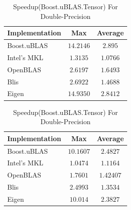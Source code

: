 \begin{table}[ht]
    \centering
    \caption{Speedup(Boost.uBLAS.Tensor) For Single-Precision}
    \begin{tabular}{|l|c|c|}
        \hline
        \textbf{Implementation} & \textbf{Max} & \textbf{Average}\\
        \hline
        Boost.uBLAS         & $14.2146$ & $2.895$ \\
        \hline
        Intel's MKL         & $1.3135$ & $1.0766$ \\
        \hline
        OpenBLAS            & $2.6197$ & $1.6493$ \\
        \hline
        Blis                & $2.6922$ & $1.4688$ \\
        \hline
        Eigen               & $14.9350$ & $2.8412$ \\
        \hline
    \end{tabular}

    \vspace*{1 cm}

    \centering
    \caption{Speedup(Boost.uBLAS.Tensor) For Double-Precision}
    \begin{tabular}{|l|c|c|}
        \hline
        \textbf{Implementation} & \textbf{Max} & \textbf{Average}\\
        \hline
        Boost.uBLAS         & $10.1607$ & $2.4827$ \\
        \hline
        Intel's MKL         & $1.0474$ & $1.1164$ \\
        \hline
        OpenBLAS            & $1.7601$ & $1.42407$ \\
        \hline
        Blis                & $2.4993$ & $1.3534$ \\
        \hline
        Eigen               & $10.014$ & $2.3827$ \\
        \hline
    \end{tabular}
\end{table}
